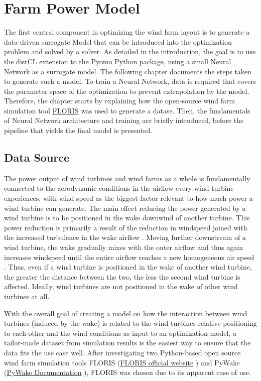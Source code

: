 \documentclass[preprint,12pt]{elsarticle}
\begin{document}
\section{Farm Power Model}\label{chapter:power_model}

The first central component in optimizing the wind farm layout is to generate a data-driven surrogate Model that can be introduced into the optimization problem and solved by a solver. As detailed in the introduction, the goal is to use the distCL extension \cite{alcantara_ruiz_distcl_2022_git} to the Pyomo Python package, using a small Neural Network as a surrogate model. The following chapter documents the steps taken to generate such a model. 
To train a Neural Network, data is required that covers the parameter space of the optimization to prevent extrapolation by the model. Therefore, the chapter starts by explaining how the open-source wind farm simulation tool \href{https://www.nrel.gov/wind/floris.html}{FLORIS} \cite{nrel_floris} was used to generate a datase. Then, the fundamentals of Neural Network architecture and training are briefly introduced, before the pipeline that yields the final model is presented.


\subsection{Data Source}

The power output of wind turbines and wind farms as a whole is fundamentally connected to the aerodynamic conditions in the airflow every wind turbine experiences, with wind speed as the biggest factor relevant to how much power a wind turbine can generate. The main effect reducing the power generated by a wind turbine is to be positioned in the wake downwind of another turbine. This power reduction is primarily a result of the reduction in windspeed joined with the increased turbulence in the wake airflow \cite{KIRANOUDIS1997439}. Moving further downstream of a wind turbine, the wake gradually mixes with the outer airflow and thus again increases windspeed until the entire airflow reaches a new homogeneous air speed \cite{MAGNUSSON1999169}. Thus, even if a wind turbine is positioned in the wake of another wind turbine, the greater the distance between the two, the less the second wind turbine is affected. Ideally, wind turbines are not positioned in the wake of other wind turbines at all. 


With the overall goal of creating a model on how the interaction between wind turbines (induced by the wake) is related to the wind turbines relative positioning to each other and the wind conditions as input to an optimization model, a tailor-made dataset from simulation results is the easiest way to ensure that the data fits the use case well. After investigating two Python-based open source wind farm simulation tools FLORIS (\href{https://www.nrel.gov/wind/floris}{FLORIS official website} \cite{nrel_floris_web}) and PyWake (\href{https://topfarm.pages.windenergy.dtu.dk/PyWake/}{PyWake Documentation} \cite{dtu_pywake_2025}), FLORIS was chosen due to its apparent ease of use. 
\end{document}
